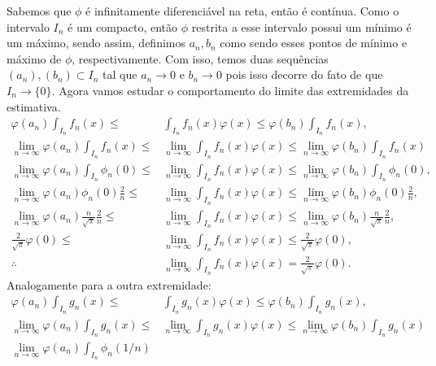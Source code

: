 \documentclass{article}
\begin{document}
\begin{enumerate}
\begin{enumerate}
				Sabemos que $\phi$ é infinitamente diferenciável na reta, então é contínua. Como o intervalo $I_{n}$ é um compacto, então $\phi$ restrita a esse intervalo possui um mínimo é um máximo, sendo assim, definimos $a_{n}, b_{n}$ como sendo esses pontos de mínimo e máximo de $\phi$, respectivamente. Com isso, temos duas sequências $(a_{n}), (b_{n}) \subset I_{n}$ tal que $a_{n} \to 0$ e $b_{n} \to 0$ pois isso decorre do fato de que $I_{n} \to \{0\}$. Agora vamos estudar o comportamento do limite das extremidades da estimativa.
				$$
				\begin{aligned}
				\varphi(a_{n}) \int_{I_{n}} f_{n}(x) 
				\leq & \int_{I_{n}} f_{n}(x)\varphi(x) \leq \varphi(b_{n}) \int_{I_{n}} f_{n}(x), \\
				\lim_{n \to \infty} \varphi(a_{n}) \int_{I_{n}} f_{n}(x) 
				\leq & \lim_{n \to \infty}\int_{I_{n}} f_{n}(x)\varphi(x) \leq  \lim_{n \to \infty} \varphi(b_{n}) \int_{I_{n}} f_{n}(x) \\
				\lim_{n \to \infty} \varphi(a_{n}) \int_{I_{n}} \phi_{n}(0)
				\leq & \lim_{n \to \infty}\int_{I_{n}} f_{n}(x)\varphi(x) \leq  \lim_{n \to \infty} \varphi(b_{n}) \int_{I_{n}} \phi_{n}(0), \\
				\lim_{n \to \infty} \varphi(a_{n}) \phi_{n}(0) \frac{2}{n}
				\leq & \lim_{n \to \infty}\int_{I_{n}} f_{n}(x)\varphi(x) \leq  \lim_{n \to \infty} \varphi(b_{n}) \phi_{n}(0) \frac{2}{n}, \\
				\lim_{n \to \infty} \varphi(a_{n}) \frac{n}{\sqrt{\pi}} \frac{2}{n}
				\leq & \lim_{n \to \infty}\int_{I_{n}} f_{n}(x)\varphi(x) \leq  \lim_{n \to \infty} \varphi(b_{n}) \frac{n}{\sqrt{\pi}} \frac{2}{n}, \\
				\frac{2}{\sqrt{\pi}} \varphi(0)
				\leq & \lim_{n \to \infty}\int_{I_{n}} f_{n}(x)\varphi(x) \leq  \frac{2}{\sqrt{\pi}} \varphi(0), \\
				\therefore & \lim_{n \to \infty}\int_{I_{n}} f_{n}(x)\varphi(x) = \frac{2}{\sqrt{\pi}} \varphi(0).
				\end{aligned}
				$$
				Analogamente para a outra extremidade:
				$$
				\begin{aligned}
				\varphi(a_{n}) \int_{I_{n}} g_{n}(x) 
				\leq & \int_{I_{n}} g_{n}(x)\varphi(x) \leq \varphi(b_{n}) \int_{I_{n}} g_{n}(x), \\
				\lim_{n \to \infty} \varphi(a_{n}) \int_{I_{n}} g_{n}(x) 
				\leq & \lim_{n \to \infty}\int_{I_{n}} g_{n}(x)\varphi(x) \leq  \lim_{n \to \infty} \varphi(b_{n}) \int_{I_{n}} g_{n}(x) \\
				\lim_{n \to \infty} \varphi(a_{n}) \int_{I_{n}} \phi_{n}(1/n)

\end{aligned}$$
\end{enumerate}
\end{enumerate}
\end{document}
